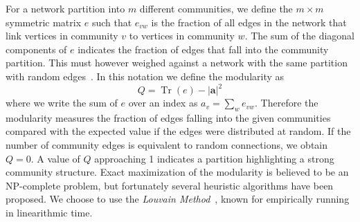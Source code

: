 \documentclass[a4paper,12pt,twoside]{article}
\def \be {\begin{equation}}
\def \ee {\end{equation}}
\def \bf {\textbf}
\DeclareMathOperator{\Tr}{Tr}
\begin{document}
For a network partition into $m$ different communities, we define the $m \times m$ symmetric matrix $e$ such that $e_{vw}$ is the fraction of all edges in the network that link vertices in community $v$ to vertices in community $w$. 
The sum of the diagonal components of $e$ indicates the fraction of edges that fall into the community partition.
This must however weighed against a network with the same partition with random edges~\cite{newman2004}.
In this notation we define the modularity as
\be
  Q = \Tr(e) - |\bf{a}|^2 
\ee
where we write the sum of $e$ over an index as $a_v = \sum_{w} e_{vw}$.
Therefore the modularity measures the fraction of edges falling into the given communities compared with the expected value if the edges were distributed at random.
If the number of community edges is equivalent to random connections, we obtain $Q = 0$. A  value of $Q$ approaching 1 indicates a partition highlighting a strong community structure.
Exact maximization of the modularity is believed to be an NP-complete problem, but fortunately several heuristic algorithms have been proposed.
We choose to use the {\em Louvain Method}~\cite{blondel2008}, known for empirically running in linearithmic time.
\end{document}
